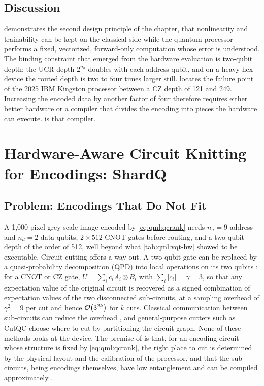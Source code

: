 \subsection{Discussion}\label{sec:qml:vqt:discussion}

\vqt{} demonstrates the second design principle of the chapter, that nonlinearity and trainability can be kept on the classical side while the quantum processor performs a fixed, vectorized, forward-only computation whose error is understood. The binding constraint that emerged from the hardware evaluation is two-qubit depth: the UCR depth $2^{n_a}$ doubles with each address qubit, and on a heavy-hex device the routed depth is two to four times larger still.  locates the failure point of the 2025 IBM Kingston processor between a CZ depth of 121 and 249. Increasing the encoded data by another factor of four therefore requires either better hardware or a compiler that divides the encoding into pieces the hardware can execute. \shardq{} is that compiler.

\section{Hardware-Aware Circuit Knitting for Encodings: ShardQ}\label{sec:qml:shardq}

\subsection{Problem: Encodings That Do Not Fit}\label{sec:qml:shardq:problem}

A 1,000-pixel grey-scale image encoded by \cref{eq:qml:qcrank} needs $n_a = 9$ address and $n_d = 2$ data qubits, $2 \times 512$ CNOT gates before routing, and a two-qubit depth of the order of 512, well beyond what \cref{tab:qml:vqt-hw} showed to be executable. Circuit cutting offers a way out. A two-qubit gate can be replaced by a quasi-probability decomposition (QPD) into local operations on its two qubits \cite{mitarai2021virtualgate,peng2020circuitcutting,bravyi2016trading}: for a CNOT or CZ gate, $U = \sum_i c_i A_i \otimes B_i$ with $\sum_i |c_i| = \gamma = 3$, so that any expectation value of the original circuit is recovered as a signed combination of expectation values of the two disconnected sub-circuits, at a sampling overhead of $\gamma^2 = 9$ per cut and hence $\mathcal{O}\!\left(3^{2k}\right)$ for $k$ cuts. Classical communication between sub-circuits can reduce the overhead \cite{piveteau2024knitting}, and general-purpose cutters such as CutQC \cite{tang2021cutqc} choose where to cut by partitioning the circuit graph. None of these methods looks at the device. The premise of \shardq{} is that, for an encoding circuit whose structure is fixed by \cref{eq:qml:qcrank}, the right place to cut is determined by the physical layout and the calibration of the processor, and that the sub-circuits, being encodings themselves, have low entanglement and can be compiled approximately \cite{guo2025shardq}.

